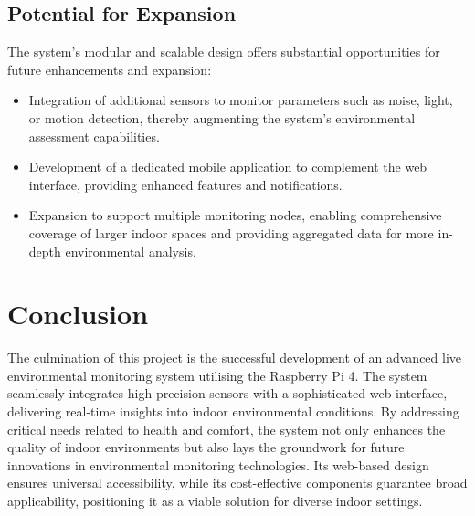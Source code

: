 \documentclass[a4paper, 12pt]{report}
\begin{document}
\subsection{Potential for Expansion}
The system's modular and scalable design offers substantial opportunities for future enhancements and expansion:
\begin{itemize}
    \item Integration of additional sensors to monitor parameters such as noise, light, or motion detection, thereby augmenting the system's environmental assessment capabilities.
    \item Development of a dedicated mobile application to complement the web interface, providing enhanced features and notifications.
    \item Expansion to support multiple monitoring nodes, enabling comprehensive coverage of larger indoor spaces and providing aggregated data for more in-depth environmental analysis.
\end{itemize}

\section{Conclusion}
The culmination of this project is the successful development of an advanced live environmental monitoring system utilising the Raspberry Pi 4. The system seamlessly integrates high-precision sensors with a sophisticated web interface, delivering real-time insights into indoor environmental conditions. By addressing critical needs related to health and comfort, the system not only enhances the quality of indoor environments but also lays the groundwork for future innovations in environmental monitoring technologies. Its web-based design ensures universal accessibility, while its cost-effective components guarantee broad applicability, positioning it as a viable solution for diverse indoor settings.

\printbibliography
\end{document}
